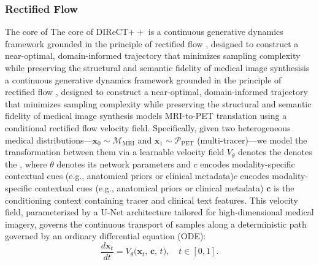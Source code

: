 \documentclass{article}
\providecommand{\DIFaddtex}[1]{{\protect\color{blue} \sf #1}} %
\providecommand{\DIFdeltex}[1]{{\protect\color{red} \ifmmode #1\else\scriptsize #1\fi}} %
\providecommand{\DIFaddbegin}{} %
\providecommand{\DIFaddend}{} %
\providecommand{\DIFdelbegin}{} %
\providecommand{\DIFdelend}{} %
\providecommand{\DIFadd}[1]{\texorpdfstring{\DIFaddtex{#1}}{#1}} %
\providecommand{\DIFdel}[1]{\texorpdfstring{\DIFdeltex{#1}}{}} %
\newcommand{\DIFscaledelfig}{0.5}
\newlength{\DIFdelgraphicswidth} %
\newlength{\DIFdelgraphicsheight} %
\newcommand{\DIFaddincludegraphics}[2][]{{\color{blue}\fbox{\DIFOincludegraphics[#1]{#2}}}} %
\newcommand{\DIFdelincludegraphics}[2][]{%
\sbox{\DIFdelgraphicsbox}{\DIFOincludegraphics[#1]{#2}}%
\settoboxwidth{\DIFdelgraphicswidth}{\DIFdelgraphicsbox} %
\settoboxtotalheight{\DIFdelgraphicsheight}{\DIFdelgraphicsbox} %
\scalebox{\DIFscaledelfig}{%
\parbox[b]{\DIFdelgraphicswidth}{\usebox{\DIFdelgraphicsbox}\\[-\baselineskip] \rule{\DIFdelgraphicswidth}{0em}}\llap{\resizebox{\DIFdelgraphicswidth}{\DIFdelgraphicsheight}{%
\setlength{\unitlength}{\DIFdelgraphicswidth}%
\begin{picture}(1,1)%
\thicklines\linethickness{2pt} %
{\color[rgb]{1,0,0}\put(0,0){\framebox(1,1){}}}%
{\color[rgb]{1,0,0}\put(0,0){\line( 1,1){1}}}%
{\color[rgb]{1,0,0}\put(0,1){\line(1,-1){1}}}%
\end{picture}%
}\hspace*{3pt}}} %
} %
\DeclareRobustCommand{\DIFaddbegin}{\DIFOaddbegin \let\includegraphics\DIFaddincludegraphics} %
\DeclareRobustCommand{\DIFaddend}{\DIFOaddend \let\includegraphics\DIFOincludegraphics} %
\DeclareRobustCommand{\DIFdelbegin}{\DIFOdelbegin \let\includegraphics\DIFdelincludegraphics} %
\DeclareRobustCommand{\DIFdelend}{\DIFOaddend \let\includegraphics\DIFOincludegraphics} %
\begin{document}
\subsubsection{Rectified Flow}
\DIFdelbegin \DIFdel{The core of }\DIFdelend DIReCT$++$ \DIFdelbegin \DIFdel{is a continuous generative dynamics framework grounded in the principle of rectified flow , designed to construct a near-optimal, domain-informed trajectory that minimizes sampling complexity while preserving the structural and semantic fidelity of medical image synthesis}\DIFdelend \DIFaddbegin \DIFadd{models MRI-to-PET translation using a conditional rectified flow velocity field}\DIFaddend . Specifically, given two heterogeneous medical distributions---$\mathbf{x}_0 \sim \mathcal{M}_{\text{MRI}}$ and $\mathbf{x}_1 \sim \mathcal{P}_{\text{PET}}$ (multi-tracer)---we model the transformation between them via a learnable velocity field $V_\theta$\DIFdelbegin \DIFdel{denotes the }\DIFdelend \DIFaddbegin \DIFadd{, where $\theta$ denotes its }\DIFaddend network parameters and \DIFdelbegin \DIFdel{$c$ encodes modality-specific contextual cues (e.g., anatomical priors or clinical metadata)}\DIFdelend \DIFaddbegin \DIFadd{$\mathbf{c}$ is the conditioning context containing tracer and clinical text features}\DIFaddend . This velocity field, parameterized by a U-Net architecture tailored for high-dimensional medical imagery, governs the continuous transport of samples along a deterministic path governed by an ordinary differential equation (ODE):
\begin{equation}
\frac{d\mathbf{x}_t}{dt} = V_\theta\big(\mathbf{x}_t,\, \mathbf{c},\, t\big), \quad t \in [0, 1].
\label{eq:rf_ode}
\end{equation}
\end{document}
